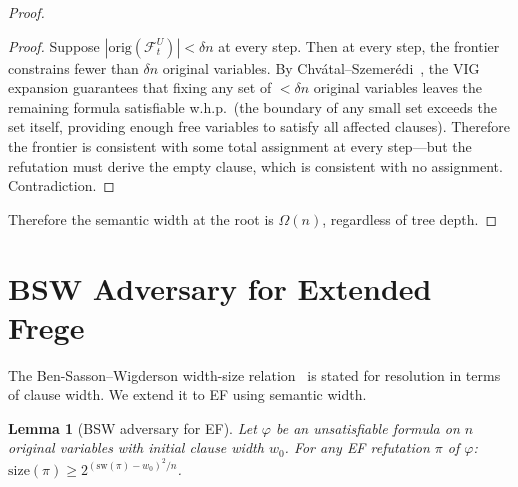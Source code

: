 \documentclass[11pt]{article}
\newtheorem{lemma}[theorem]{Lemma}
\theoremstyle{definition}
\newcommand{\size}{\mathrm{size}}
\newcommand{\frontier}{\mathcal{F}}
\begin{document}
\begin{proof}
\begin{proof}
Suppose $|\mathrm{orig}(\frontier_t^U)| < \delta n$ at every step.
Then at every step, the frontier constrains fewer than $\delta n$
original variables.  By
Chv\'{a}tal--Szemer\'{e}di~\cite{Chvatal1988}, the VIG expansion
guarantees that fixing any set of $< \delta n$ original variables
leaves the remaining formula satisfiable w.h.p.\ (the boundary of
any small set exceeds the set itself, providing enough free variables
to satisfy all affected clauses).  Therefore the frontier is
consistent with some total assignment at every step---but the
refutation must derive the empty clause, which is consistent with
no assignment.  Contradiction.
\end{proof}

Therefore the semantic width at the root is $\Omega(n)$, regardless
of tree depth.
\end{proof}

\section{BSW Adversary for Extended Frege}\label{sec:bsw-ef}

The Ben-Sasson--Wigderson width-size relation~\cite{BenSasson2001} is
stated for resolution in terms of clause width.  We extend it to EF
using semantic width.

\begin{lemma}[BSW adversary for EF]\label{lem:BSW-EF}
Let $\varphi$ be an unsatisfiable formula on $n$ original variables
with initial clause width $w_0$.  For any EF refutation $\pi$ of
$\varphi$: $\size(\pi) \geq 2^{(\mathrm{sw}(\pi) - w_0)^2 / n}$.
\end{lemma}
\end{document}
